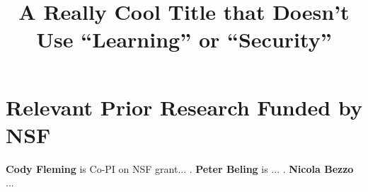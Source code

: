 \documentclass[11pt,letterpaper]{article}
\title{A Really Cool Title that Doesn't Use ``Learning'' or ``Security''}
\date{}
\begin{document}











\section{Relevant Prior Research Funded by NSF}
{\bf Cody Fleming} is Co-PI on NSF grant... . {\bf Peter Beling} is ... . {\bf Nicola Bezzo} ...
\end{document}
